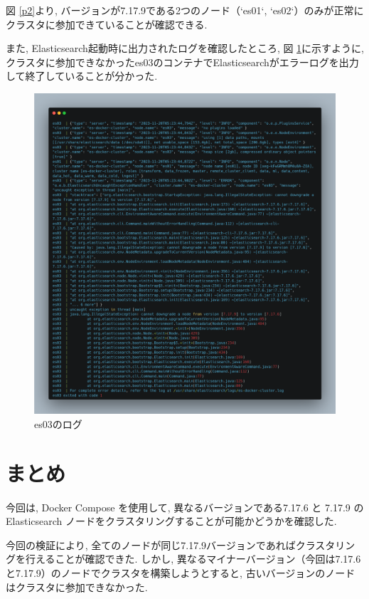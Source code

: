 \documentclass[a4j,12pt,]{jarticle}
\begin{document}
図 \ref{p2}より, バージョンが7.17.9である2つのノード（`es01`, `es02`）のみが正常にクラスタに参加できていることが確認できる.

また, Elasticsearch起動時に出力されたログを確認したところ, 図 \ref{p3}に示すように, クラスタに参加できなかったes03のコンテナでElasticsearchがエラーログを出力して終了していることが分かった.

\begin{figure}[H]
  \begin{center}
    \includegraphics[width=160mm]{log.png}
    \caption{es03のログ}
    \label{p3}
  \end{center}
\end{figure}

\section{まとめ}
今回は, Docker Compose を使用して, 異なるバージョンである7.17.6 と 7.17.9 の Elasticsearch ノードをクラスタリングすることが可能かどうかを確認した.

今回の検証により, 全てのノードが同じ7.17.9バージョンであればクラスタリングを行えることが確認できた. しかし, 異なるマイナーバージョン（今回は7.17.6と7.17.9）のノードでクラスタを構築しようとすると, 古いバージョンのノードはクラスタに参加できなかった.
\end{document}
